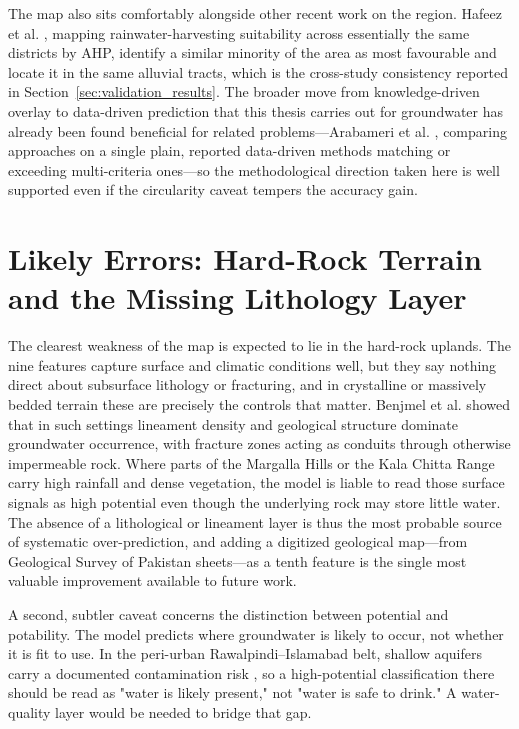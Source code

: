 The map also sits comfortably alongside other recent work on the region. Hafeez et
al. \cite{hafeez2025rwh}, mapping rainwater-harvesting suitability across
essentially the same districts by AHP, identify a similar minority of the area as
most favourable and locate it in the same alluvial tracts, which is the
cross-study consistency reported in Section~\ref{sec:validation_results}. The
broader move from knowledge-driven overlay to data-driven prediction that this
thesis carries out for groundwater has already been found beneficial for related
problems---Arabameri et al. \cite{arabameri2018shahroud}, comparing approaches on
a single plain, reported data-driven methods matching or exceeding multi-criteria
ones---so the methodological direction taken here is well supported even if the
circularity caveat tempers the accuracy gain.

\section{Likely Errors: Hard-Rock Terrain and the Missing Lithology Layer}
\label{sec:discuss_hardrock}

The clearest weakness of the map is expected to lie in the hard-rock uplands. The
nine features capture surface and climatic conditions well, but they say nothing
direct about subsurface lithology or fracturing, and in crystalline or massively
bedded terrain these are precisely the controls that matter. Benjmel et al.
\cite{benjmel2020morocco} showed that in such settings lineament density and
geological structure dominate groundwater occurrence, with fracture zones acting
as conduits through otherwise impermeable rock. Where parts of the Margalla Hills
or the Kala Chitta Range carry high rainfall and dense vegetation, the model is
liable to read those surface signals as high potential even though the underlying
rock may store little water. The absence of a lithological or lineament layer is
thus the most probable source of systematic over-prediction, and adding a
digitized geological map---from Geological Survey of Pakistan sheets---as a tenth
feature is the single most valuable improvement available to future work.

A second, subtler caveat concerns the distinction between potential and
potability. The model predicts where groundwater is likely to occur, not whether
it is fit to use. In the peri-urban Rawalpindi--Islamabad belt, shallow aquifers
carry a documented contamination risk \cite{waseem2024waterquality}, so a
high-potential classification there should be read as "water is likely present,"
not "water is safe to drink." A water-quality layer would be needed to bridge that
gap.

